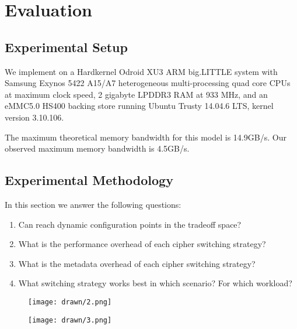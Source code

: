 \section{Evaluation}\label{sec:evaluation}

\subsection{Experimental Setup}

We implement \SYSTEM{} on a Hardkernel Odroid XU3 ARM big.LITTLE system with
Samsung Exynos 5422 A15/A7 heterogeneous multi-processing quad core CPUs at
maximum clock speed, 2 gigabyte LPDDR3 RAM at 933 MHz, and an eMMC5.0 HS400
backing store running Ubuntu Trusty 14.04.6 LTS, kernel version 3.10.106.

The maximum theoretical memory bandwidth for this model is 14.9GB/s\@. Our
observed maximum memory bandwidth is 4.5GB/s.

\subsection{Experimental Methodology}

In this section we answer the following questions:

\begin{enumerate}
 \item Can \SYSTEM{} reach dynamic configuration points in the tradeoff space?
 \item What is the performance overhead of each cipher switching strategy?
 \item What is the metadata overhead of each cipher switching strategy?
 \item What switching strategy works best in which scenario? For which workload?
\end{enumerate}

\begin{figure}[ht]
 \centering
  \texttt{[image: drawn/2.png]}
   \caption{}\label{fig:40mb-vs-1kb-read}
\end{figure}

\begin{figure}[ht]
 \centering
  \texttt{[image: drawn/3.png]}
   \caption{}\label{fig:40mb-read-vs-write}
\end{figure}


